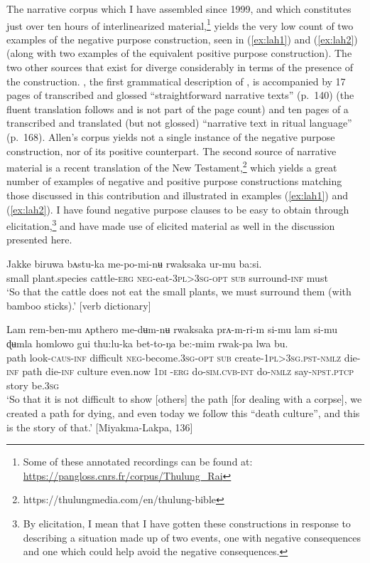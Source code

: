 \documentclass[output=paper,colorlinks,citecolor=brown]{langscibook}
\begin{document}
The  narrative corpus which I have assembled since 1999, and which constitutes just over ten hours of interlinearized material,\footnote{Some of these annotated recordings can be found at: \url{https://pangloss.cnrs.fr/corpus/Thulung\_Rai}} yields the very low count of two examples of the negative purpose construction, seen in (\ref{ex:lah1}) and (\ref{ex:lah2}) (along with two examples of the equivalent positive purpose construction). The two other sources that exist for  diverge considerably in terms of the presence of the construction. \citet{Allen1975}, the first grammatical description of , is accompanied by 17 pages of transcribed and glossed ``straightforward narrative texts'' (p.\ 140) (the fluent translation follows and is not part of the page count) and ten pages of a transcribed and translated (but not glossed) ``narrative text in ritual language'' (p.\ 168). Allen's corpus yields not a single instance of the negative purpose construction, nor of its positive counterpart. The second source of  narrative material is a recent  translation of the New Testament,\footnote{https://thulungmedia.com/en/thulung-bible} which yields a great number of examples of negative and positive purpose constructions matching those discussed in this contribution and illustrated in examples (\ref{ex:lah1}) and (\ref{ex:lah2}). I have found negative purpose clauses to be easy to obtain through elicitation,\footnote{By elicitation, I mean that I have gotten these constructions in response to describing a situation made up of two events, one with negative consequences and one which could help avoid the negative consequences.} and have made use of elicited material as well in the discussion presented here.



\ea \label{ex:lah1}
\gll Jakke biruwa bʌstu-ka me-po-mi-nʉ rwaksaka ur-mu ba:si. \\
small plant.species cattle-\textsc{erg} \textsc{neg}-eat-\textsc{3pl>3sg-opt} \textsc{sub} surround-\textsc{inf} must \\
\glt `So that the cattle does not eat the small plants, we must surround them (with bamboo sticks).' [verb dictionary]
\z


\ea \label{ex:lah2}
\gll Lam rem-ben-mu ʌpthero me-dʉm-nʉ rwaksaka prʌ-m-ri-m si-mu lam si-mu ɖʉmla homlowo gui thu:lu-ka bet-to-ŋa be:-mim rwak-pa lwa bu. \\
path look-\textsc{caus-inf} difficult \textsc{neg}-become.\textsc{3sg-opt} \textsc{sub} create-\textsc{1pl>3sg.pst-nmlz} die-\textsc{inf} path die-\textsc{inf} culture even.now \textsc{1di} -\textsc{erg} do-\textsc{sim.cvb-int} do-\textsc{nmlz} say-\textsc{npst.ptcp} story be.\textsc{3sg} \\
\glt `So that it is not difficult to show [others] the path [for dealing with a corpse], we created a path for dying, and even today we  follow this ``death culture'', and this is the story of that.' [Miyakma-Lakpa, 136]
\z
\end{document}
